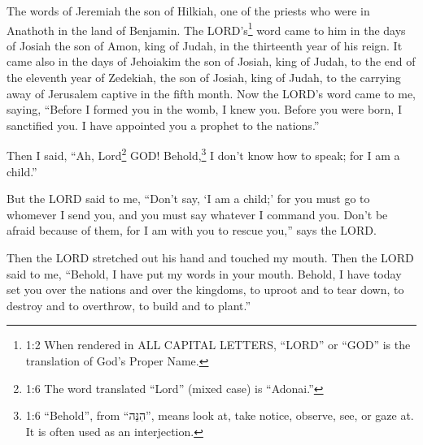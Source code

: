 





\vspace{-1.36in}

\mychapter{}\myverse*{}The words of Jeremiah the son of Hilkiah, one of the priests who were in Anathoth in the land of Benjamin. \myverse{}The LORD’s\footnote{1:2 When rendered in ALL CAPITAL LETTERS, “LORD” or “GOD” is the translation of God’s Proper Name.} word came to him in the days of Josiah the son of Amon, king of Judah, in the thirteenth year of his reign. \myverse{}It came also in the days of Jehoiakim the son of Josiah, king of Judah, to the end of the eleventh year of Zedekiah, the son of Josiah, king of Judah, to the carrying away of Jerusalem captive in the fifth month. \myverse{}Now the LORD’s word came to me, saying, \myverse{}“Before I formed you in the womb, I knew you. Before you were born, I sanctified you. I have appointed you a prophet to the nations.”


\myverse{}Then I said, “Ah, Lord\footnote{1:6 The word translated “Lord” (mixed case) is “Adonai.”
} GOD! Behold,\footnote{1:6 “Behold”, from “הִנֵּה”, means look at, take notice, observe, see, or gaze at. It is
	often used as an interjection.} I don’t know how to speak; for I am a child.”


\myverse{}But the LORD said to me, “Don’t say, ‘I am a child;’ for you must go to whomever I send you, and you must say whatever I command you. \myverse{}Don’t be afraid because of them, for I am with you to rescue you,” says the
LORD.


\myverse{}Then the LORD stretched out his hand and touched my mouth. Then the LORD said to me, “Behold, I have put my words in your mouth. \myverse{}Behold, I have today set you over the nations and over the kingdoms, to uproot and to tear down, to destroy and to overthrow, to build and to plant.”

